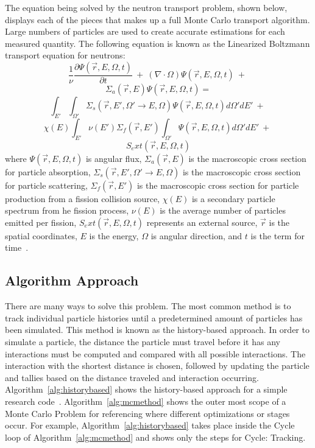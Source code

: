 %
The equation being solved by the neutron transport problem, shown below, displays each of the pieces that makes up a full Monte Carlo transport algorithm.
%
Large numbers of particles are used to create accurate estimations for each measured quantity.
%
The following equation is known as the Linearized Boltzmann transport equation for neutrons:
%
$$
\frac{1}{\nu} \frac{ \partial \Psi ( \vec{r}, E, \Omega, t ) }{\partial t}\ +\ 
(\nabla \cdot \Omega ) \Psi ( \vec{r}, E, \Omega, t )\ +\
$$
$$ 
\Sigma_a (\vec{r}, E ) \Psi ( \vec{r}, E, \Omega, t ) =$$
$$
\int _{E '} \int _{\Omega '} \Sigma_{s} ( \vec{r}, E', \Omega ' \rightarrow E, \Omega ) \Psi (\vec{r}, E, \Omega, t) d \Omega ' dE'\ +\ 
$$
$$
\chi (E) \int _{E'} \nu (E') \Sigma_{f} (\vec{r},E') \int _{\Omega '} \Psi ( \vec{r}, E, \Omega, t ) d \Omega ' dE'\ +\ $$
$$
S_ext(\vec{r}, E, \Omega, t )
$$
%
where $ \Psi ( \vec{r}, E, \Omega, t ) $ is angular flux, 
$\Sigma_a (\vec{r}, E )$ is the macroscopic cross section for particle absorption, 
$\Sigma_{s} ( \vec{r}, E', \Omega ' \rightarrow E, \Omega )$ is the macroscopic cross section for particle scattering,
$\Sigma_{f} (\vec{r},E') $ is the macroscopic cross section for particle production from a fission collision source,
$\chi (E)$ is a secondary particle spectrum from he fission process,
$\nu (E)$ is the average number of particles emitted per fission,
$S_ext(\vec{r}, E, \Omega, t )$ represents an external source,
$\vec{r}$ is the spatial coordinates,
$E$ is the energy,
$\Omega$ is angular direction,
and $t$ is the term for time~\cite{gentileMCPTAPO}.
%

\subsection{ \textbf{ Algorithm Approach} }

There are many ways to solve this problem.
%
The most common method is to track individual particle histories until a predetermined amount of particles has been simulated.
%
This method is known as the history-based approach.
%
In order to simulate a particle, the distance the particle must travel before it has any interactions must be computed and compared with all possible interactions.
%
The interaction with the shortest distance is chosen, followed by updating the particle and tallies based on the distance traveled and interaction occurring.
% 
Algorithm~\ref{alg:historybased} shows the history-based approach for a simple research code~\cite{alpsmc1}.
%
Algorithm~\ref{alg:mcmethod} shows the outer most scope of a Monte Carlo Problem for referencing where different optimizations or stages occur.
%
For example, Algorithm~\ref{alg:historybased} takes place inside the Cycle loop of Algorithm~\ref{alg:mcmethod} and shows only the steps for Cycle: Tracking.

